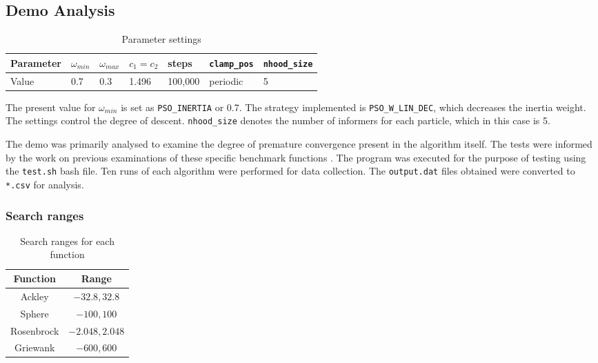 \documentclass[KomodoMain.tex]{subfiles}
\begin{document}
\subsection{Demo Analysis}

\begin{table}[h]
\caption{Parameter settings}
\label{table:X}
\begin{tabular}{ p{1.75cm} p{1.4cm} p{1.4cm} p{1.75cm} p{1.5cm} p{2cm} p{2cm} }
 \hline
 Parameter   & $\omega_{min}$  & $\omega_{max}$ & $c_{1} = c_{2}$ & steps & \texttt{clamp\_pos} & \texttt{nhood\_size} \\
 \hline
 Value   & 0.7  & 0.3 &  1.496 & 100,000 & periodic & 5 \\
 \hline
\end{tabular}
\end{table}

The present value for $\omega_{min}$ is set as \texttt{PSO\_INERTIA} or 0.7. The strategy implemented is \texttt{PSO\_W\_LIN\_DEC}, which decreases the inertia weight. The settings control the degree of descent. \texttt{nhood\_size} denotes the number of informers for each particle, which in this case is 5.
\par
The demo was primarily analysed to examine the degree of premature convergence present in the algorithm itself. The tests were informed by the work on previous examinations of these specific benchmark functions \cite{funcs}. The program was executed for the purpose of testing using the \texttt{test.sh} bash file. Ten runs of each algorithm were performed for data collection. The \texttt{output.dat} files obtained were converted to \texttt{*.csv} for analysis.

\subsubsection{Search ranges}

\begin{table}[h]
\centering
\caption{Search ranges for each function}
\label{table:X}
\begin{tabular}{ |c c| }
 \hline
 Function   & Range \\
 \hline
 Ackley   & $-32.8, 32.8$  \\
 \hline
 Sphere & $-100, 100$ \\
 \hline
 Rosenbrock & $-2.048, 2.048$ \\
 \hline
 Griewank & $-600, 600$ \\
 \hline
\end{tabular}
\end{table}
\end{document}
